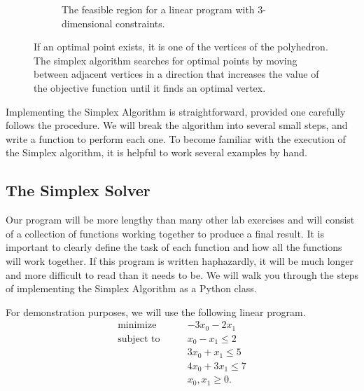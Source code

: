 \begin{figure}[H]
\begin{subfigure}{.5\textwidth}
\begin{center}
    \end{center}
    \caption{The feasible region for a linear program with 3-dimensional constraints.}
\end{subfigure}
\caption{If an optimal point exists, it is one of the vertices of the polyhedron.
The simplex algorithm searches for optimal points by moving between adjacent vertices in a direction that increases the value of the objective function until it finds an optimal vertex.}
\label{fig:polytope}
\end{figure}




Implementing the Simplex Algorithm is straightforward, provided one carefully follows the procedure.
We will break the algorithm into several small steps, and write a function to perform each one.
To become familiar with the execution of the Simplex algorithm, it is helpful to work several examples by hand.

\subsection*{The Simplex Solver} %

Our program will be more lengthy than many other lab exercises and will consist of a collection of functions working together to produce a final result.
It is important to clearly define the task of each function and how all the functions will work together.
If this program is written haphazardly, it will be much longer and more difficult to read than it needs to be.
We will walk you through the steps of implementing the Simplex Algorithm as a Python class.

For demonstration purposes, we will use the following linear program.
\begin{align*}
\text{minimize}\qquad & -3x_0 - 2x_1 \\
\text{subject to}\qquad
& x_0 - x_1 \leq 2 \\
& 3x_0 + x_1 \leq 5 \\
& 4x_0 + 3x_1 \leq 7 \\
& x_0, x_1 \geq 0.
\end{align*}

